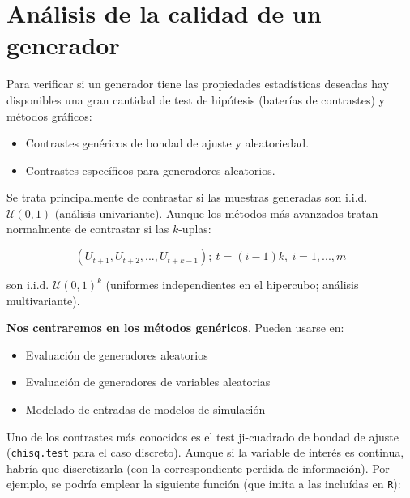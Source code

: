 \documentclass[]{book}
\theoremstyle{definition}
\theoremstyle{definition}
\theoremstyle{definition}
\theoremstyle{remark}
\begin{document}
\section{Análisis de la calidad de un
generador}\label{analisis-de-la-calidad-de-un-generador}

Para verificar si un generador tiene las propiedades estadísticas
deseadas hay disponibles una gran cantidad de test de hipótesis
(baterías de contrastes) y métodos gráficos:

\begin{itemize}
\item
  Contrastes genéricos de bondad de ajuste y aleatoriedad.
\item
  Contrastes específicos para generadores aleatorios.
\end{itemize}

Se trata principalmente de contrastar si las muestras generadas son
i.i.d. \(\mathcal{U}\left(0,1\right)\) (análisis univariante). Aunque
los métodos más avanzados tratan normalmente de contrastar si las
\(k\)-uplas:

\[(U_{t+1},U_{t+2},...,U_{t+k-1}); \ t=(i-1)k, \ i=1,...,m\]

son i.i.d. \(\mathcal{U}\left(0,1\right)^{k}\) (uniformes independientes
en el hipercubo; análisis multivariante).

\textbf{Nos centraremos en los métodos genéricos}. Pueden usarse en:

\begin{itemize}
\item
  Evaluación de generadores aleatorios
\item
  Evaluación de generadores de variables aleatorias
\item
  Modelado de entradas de modelos de simulación
\end{itemize}

Uno de los contrastes más conocidos es el test ji-cuadrado de bondad de
ajuste (\texttt{chisq.test} para el caso discreto). Aunque si la
variable de interés es continua, habría que discretizarla (con la
correspondiente perdida de información). Por ejemplo, se podría emplear
la siguiente función (que imita a las incluídas en \texttt{R}):
\end{document}
